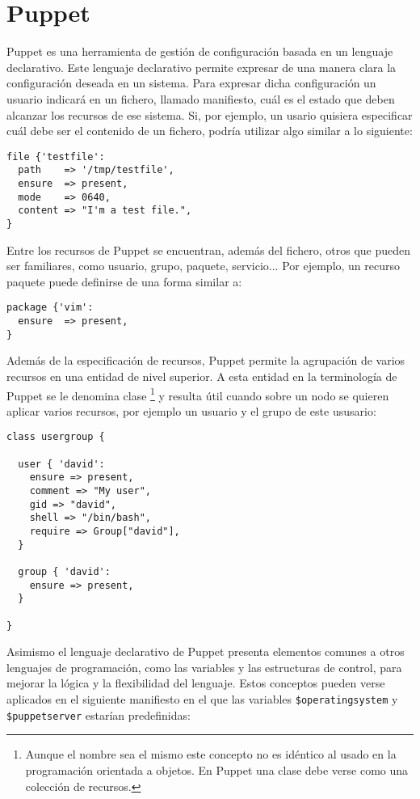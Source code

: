 \chapter{Puppet}
\label{anx:puppet-language}

Puppet es una herramienta de gestión de configuración basada en un lenguaje declarativo. Este lenguaje declarativo permite expresar de una manera clara la configuración deseada en un sistema. Para expresar dicha configuración un usuario indicará en un fichero, llamado manifiesto, cuál es el estado que deben alcanzar los recursos de ese sistema. Si, por ejemplo, un usario quisiera especificar cuál debe ser el contenido de un fichero, podría utilizar algo similar a lo siguiente:

\begin{lstlisting}
file {'testfile':
  path    => '/tmp/testfile',
  ensure  => present,
  mode    => 0640,
  content => "I'm a test file.",
}
\end{lstlisting}

Entre los recursos de Puppet se encuentran, además del fichero, otros que pueden ser familiares, como usuario, grupo, paquete, servicio... Por ejemplo, un recurso paquete puede definirse de una forma similar a:

\begin{lstlisting}
package {'vim':
  ensure  => present,
}
\end{lstlisting}

Además de la especificación de recursos, Puppet permite la agrupación de varios recursos en una entidad de nivel superior. A esta entidad en la terminología de Puppet se le denomina clase \footnote[1]{Aunque el nombre sea el mismo este concepto no es idéntico al usado en la programación orientada a objetos. En Puppet una clase debe verse como una colección de recursos.} y resulta útil cuando sobre un nodo se quieren aplicar varios recursos, por ejemplo un usuario y el grupo de este ususario:

\begin{lstlisting}
class usergroup {

  user { 'david':
    ensure => present,
    comment => "My user",
    gid => "david",
    shell => "/bin/bash",
    require => Group["david"],
  }

  group { 'david':
    ensure => present,
  }

}
\end{lstlisting}

Asimismo el lenguaje declarativo de Puppet presenta elementos comunes a otros lenguajes de programación, como las variables y las estructuras de control, para mejorar la lógica y la flexibilidad del lenguaje. Estos conceptos pueden verse aplicados en el siguiente manifiesto en el que las variables \texttt{\$operatingsystem} y \texttt{\$puppetserver} estarían predefinidas:

